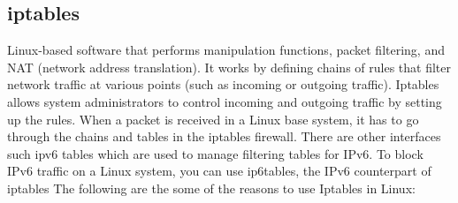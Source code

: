 %
\subsection{iptables} 
Linux-based software that performs manipulation functions, packet filtering, and NAT (network address translation). 
It works by defining chains of rules that filter network traffic at various points (such as incoming or outgoing traffic). 
Iptables allows system administrators to control incoming and outgoing traffic by setting up the rules. 
When a packet is received in a Linux base system, it has to go through the chains and 
tables in the iptables firewall.  
\vspace{3ex} \newline 
There are other interfaces such ipv6 tables which are used to manage filtering tables for IPv6. 
To block IPv6 traffic on a Linux system, you can use ip6tables, the IPv6 counterpart of iptables 
%
\vspace{3ex} \newline 
The following are the some of the reasons to use Iptables in Linux: 
